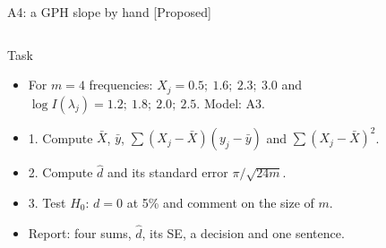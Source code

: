 \begin{frame}{A4: a GPH slope by hand [Proposed]}
\propsub
\itemsize{\scriptsize}
\begin{columns}[T]
\begin{column}{\taskw}
\begin{block}{Task}
\begin{itemize}
    \item For $m = 4$ frequencies: $X_j = 0.5;\ 1.6;\ 2.3;\ 3.0$ and $\log I(\lambda_j) = 1.2;\ 1.8;\ 2.0;\ 2.5$. Model: A3.
    \item 1. Compute $\bar X$, $\bar y$, $\sum(X_j - \bar X)(y_j - \bar y)$ and $\sum(X_j - \bar X)^2$.
    \item 2. Compute $\hat d$ and its standard error $\pi/\sqrt{24m}$.
    \item 3. Test $H_0$: $d = 0$ at 5\% and comment on the size of $m$.
    \item Report: four sums, $\hat d$, its SE, a decision and one sentence.
\end{itemize}
\end{block}
\end{column}
\begin{column}{\solw}
\end{column}
\end{columns}
\end{frame}


